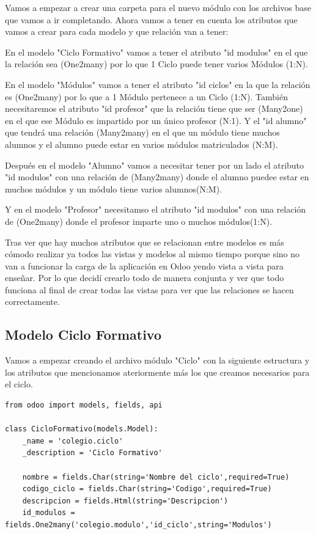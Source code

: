 \documentclass[a4paper,12pt]{article}
\begin{document}
Vamos a empezar a crear una carpeta para el nuevo módulo con los archivos base que vamos a ir completando. Ahora vamos a tener en cuenta los atributos que vamos a crear para cada modelo y que relación van a tener:

En el modelo "Ciclo Formativo" vamos a tener el atributo "id modulos" en el que la relación sea (One2many) por lo que 1 Ciclo puede tener varios Módulos (1:N).

En el modelo "Módulos" vamos a tener el atributo "id ciclos" en la que la relación es (One2many) por lo que a 1 Módulo pertenece a un Ciclo (1:N). También necesitaremos el atributo "id profesor" que la relación tiene que ser (Many2one) en el que ese Módulo es impartido por un único profesor (N:1). Y el "id alumno" que tendrá una relación (Many2many) en el que un módulo tiene muchos alumnos y el alumno puede estar en varios módulos matriculados (N:M). 

Después en el modelo "Alumno" vamos a necesitar tener por un lado el atributo "id modulos" con una relación de (Many2many) donde el alumno puedee estar en muchos módulos y un módulo tiene varios alumnos(N:M).

Y en el modelo "Profesor" necesitamso el atributo "id modulos" con una relación de (One2many) donde el profesor imparte uno o muchos módulos(1:N).


Tras ver que hay muchos atributos que se relacionan entre modelos es más cómodo realizar ya todos las vistas y modelos al mismo tiempo porque sino no van a funcionar la carga de la aplicación en Odoo yendo vista a vista para enseñar. Por lo que decidí crearlo todo de manera conjunta y ver que todo funciona al final de crear todas las vistas para ver que las relaciones se hacen correctamente.


\subsection{Modelo Ciclo Formativo}

Vamos a empezar creando el archivo módulo "Ciclo" con la siguiente estructura y los atributos que mencionamos ateriormente más los que creamos necesarios para el ciclo.

\vspace{0.5cm}
\begin{lstlisting}[style=javascript]
from odoo import models, fields, api

class CicloFormativo(models.Model):
    _name = 'colegio.ciclo'
    _description = 'Ciclo Formativo'

    nombre = fields.Char(string='Nombre del ciclo',required=True)
    codigo_ciclo = fields.Char(string='Codigo',required=True)
    descripcion = fields.Html(string='Descripcion')
    id_modulos = fields.One2many('colegio.modulo','id_ciclo',string='Modulos')
\end{lstlisting}
\end{document}

